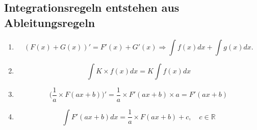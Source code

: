 \subsection{Integrationsregeln entstehen aus Ableitungsregeln}
\begin{enumerate}
\item \[(F(x) + G(x))' = F'(x) + G'(x) \Rightarrow \int f(x)dx + \int g(x)dx. \] 
\item \[\int K \times f(x)dx = K \int f(x)dx \]
\item \[\bigg( \frac{1}{a} \times F(ax+b)\bigg)'=\frac{1}{a} \times F'(ax+b)\times a = F'(ax+b)\]
\item \[ \int F' (ax+b) dx = \frac{1}{a} \times F(ax+b)+ c , \quad c \in \mathbb{R} \]
\end{enumerate}
